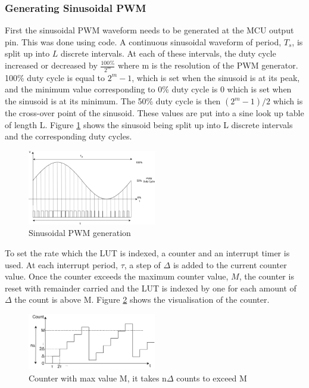 \documentclass[12pt, a4paper]{article}
\begin{document}
\subsubsection{Generating Sinusoidal PWM}
\label{sec:L_Sinusoidal PWM}
First the sinusoidal PWM waveform needs to be generated at the MCU output pin. This was done using code. A continuous sinusoidal waveform of period, $T_s$, is split up into $L$ discrete intervals. At each of these intervals, the duty cycle increased or decreased by $\frac{100\%}{2^m}$ where m is the resolution of the PWM generator. 100\% duty cycle is equal to $2^m - 1$, which is set when the sinusoid is at its peak, and the minimum value corresponding to 0\% duty cycle is 0 which is set when the sinusoid is at its minimum. The 50\% duty cycle is then $(2^m-1)/2$ which is the cross-over point of the sinusoid. These values are put into a sine look up table of length L. Figure \ref{fig:L_Sinusoidal_PWM} shows the sinusoid being split up into L discrete intervals and the corresponding duty cycles. \\

\begin{figure} [!htb]
	\hfill\includegraphics[width=0.5\textwidth]{./images/speaker/L_Sinusoidal_PWM}\hspace{\fill}
	\caption{Sinusoidal PWM generation}
	\label{fig:L_Sinusoidal_PWM}
\end{figure}
To set the rate which the LUT is indexed, a counter and an interrupt timer is used. At each interrupt period, $\tau$, a step of $\Delta$ is added to the current counter value. Once the counter exceeds the maximum counter value, $M$, the counter is reset with remainder carried and the LUT is indexed by one for each amount of $\Delta$ the count is above M. Figure \ref{fig:L_Counter} shows the visualisation of the counter. 
\begin{figure} [!htb]
	\captionsetup{justification=centering}
	\hfill\includegraphics[width=0.5\textwidth]{./images/speaker/L_Counter}\hspace{\fill}
	\caption{Counter with max value M, it takes n$\Delta$ counts to exceed M}
	\label{fig:L_Counter}
\end{figure}
\end{document}
